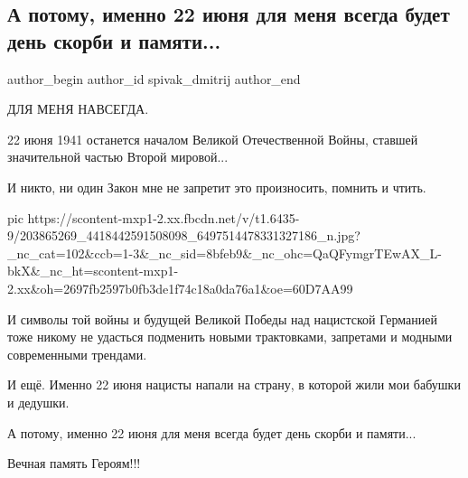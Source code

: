  
 
 
 
 
 
\subsection{А потому, именно 22 июня для меня всегда будет день скорби и памяти...}
\label{sec:22_06_2021.fb.spivak_dmitrij.1.22_jun_pamjat}
\ifcmt
 author_begin
   author_id spivak_dmitrij
 author_end
\fi

ДЛЯ МЕНЯ НАВСЕГДА.

22 июня 1941 останется началом Великой Отечественной Войны, ставшей
значительной частью Второй мировой...

И никто, ни один Закон мне не запретит это произносить, помнить и чтить. 

\ifcmt
  pic https://scontent-mxp1-2.xx.fbcdn.net/v/t1.6435-9/203865269_4418442591508098_6497514478331327186_n.jpg?_nc_cat=102&ccb=1-3&_nc_sid=8bfeb9&_nc_ohc=QaQFymgrTEwAX_L-bkX&_nc_ht=scontent-mxp1-2.xx&oh=2697fb2597b0fb3de1f74c18a0da76a1&oe=60D7AA99
\fi

И символы той войны и будущей Великой Победы над нацистской Германией тоже
никому не удасться подменить новыми трактовками, запретами и модными
современными трендами. 

И ещё. Именно 22 июня нацисты напали на страну, в которой жили мои бабушки и
дедушки. 

А потому, именно 22 июня для меня всегда будет день скорби и памяти... 

Вечная  память Героям!!!
